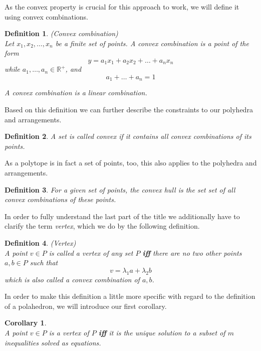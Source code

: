 \documentclass[a4paper, 11pt]{article}
\newtheorem{mydef}{Definition}
\newtheorem{corollary}{Corollary}
\begin{document}
As the convex property is crucial for this approach to work, we will define it using convex combinations.
\begin{mydef}(Convex combination)\\
	
	Let $x_1, x_2, \dots, x_n$ be a finite set of points. A convex combination is a point of the form 
	\begin{equation*}
		y = a_1x_1 + a_2x_2 + \dots + a_nx_n
	\end{equation*}
	while $a_1, \dots, a_n\in\mathbb{R^+}$, and
	\begin{equation*}
		a_1 + \dots + a_n = 1
	\end{equation*}
	
	A convex combination is a linear combination.
\end{mydef}
Based on this definition we can further describe the constraints to our polyhedra and arrangements.
\begin{mydef}
	A set is called \textit{convex} if it contains all convex combinations of its points.
\end{mydef}
As a polytope is in fact a set of points, too, this also applies to the polyhedra and arrangements.
\begin{mydef}
	For a given set of points, the convex hull is the set set of all convex combinations of these points.
\end{mydef}

In order to fully understand the last part of the title we additionally have to clarify the term \textit{vertex}, which we do by the following definition.

\begin{mydef}(Vertex)\\
	A point $v\in P$ is called a \textit{vertex} of any set $P$ \textbf{iff} there are no two other points $a,b\in P$ such that
	\begin{equation}
		v=\lambda_1 a + \lambda_2 b
	\end{equation}
	which is also called a \textit{convex combination} of $a,b$.
\end{mydef}

In order to make this definition a little more specific with regard to the definition of a polahedron, we will introduce our first corollary.

\begin{corollary}\cite{introtoAlg}\\
	A point $v\in P$ is a \textit{vertex} of $P$ \textbf{iff} it is the unique solution to a subset of $m$ inequalities solved as equations. 
\end{corollary}
\end{document}
